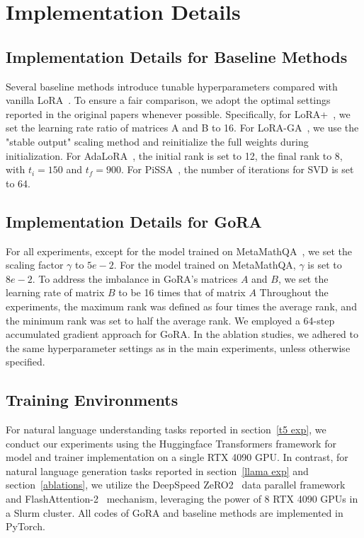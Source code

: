 \section{Implementation Details}

\subsection{Implementation Details for Baseline Methods}

Several baseline methods introduce tunable hyperparameters compared with vanilla LoRA~\citep{hu2021lora}. To ensure a fair comparison, we adopt the optimal settings reported in the original papers whenever possible. Specifically, for LoRA+~\cite{hayou2024lora+}, we set the learning rate ratio of matrices A and B to 16. For LoRA-GA~\citep{wang2024lora-ga}, we use the "stable output" scaling method and reinitialize the full weights during initialization. For AdaLoRA~\citep{zhang2023adalora}, the initial rank is set to 12, the final rank to 8, with \(t_i = 150\) and \(t_f=900\). For PiSSA~\citep{meng2024pissa}, the number of iterations for SVD is set to 64.

\subsection{Implementation Details for GoRA}
\label{tdlora implementation}
For all experiments, except for the model trained on MetaMathQA~\citep{yu2023metamath}, we set the scaling factor \(\gamma\) to \(5e-2\). For the model trained on MetaMathQA, \(\gamma\) is set to 
\(8e-2\).  To address the imbalance in GoRA's matrices 
\(A\) and \(B\), we set the learning rate of matrix 
\(B\) to be 16 times that of matrix \(A\) Throughout the experiments, the maximum rank was defined as four times the average rank, and the minimum rank was set to half the average rank. We employed a 64-step accumulated gradient approach for GoRA. In the ablation studies, we adhered to the same hyperparameter settings as in the main experiments, unless otherwise specified.

\subsection{Training Environments}
For natural language understanding tasks reported in section~\ref{t5 exp}, we conduct our experiments using the Huggingface Transformers framework for model and trainer implementation on a single RTX 4090 GPU. In contrast, for natural language generation tasks reported in section~\ref{llama exp} and section~\ref{ablations}, we utilize the DeepSpeed ZeRO2~\citep{rajbhandari2020zero} data parallel framework and FlashAttention-2~\citep{dao2023flashattention} mechanism, leveraging the power of 8 RTX 4090 GPUs in a Slurm cluster. All codes of GoRA and baseline methods are implemented in PyTorch.

